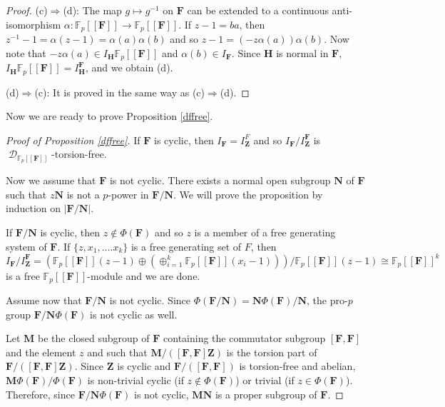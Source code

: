 \documentclass[11pt]{amsart}
\numberwithin{claimcounter}{lem}
\DeclareMathOperator{\D}{\mathcal D}
\newcommand{\F}{\mathbb{F}}
\begin{document}
\begin{proof}
  (c)$\Longrightarrow$(d): The map $g\mapsto g^{-1}$ on $\mathbf F$ can be extended to a continuous anti-isomorphism  $\alpha: \F_p[[\mathbf F]]\to \F_p[[\mathbf F]]$. If $z-1=ba$, then $z^{-1}-1=\alpha(z-1)=\alpha(a)\alpha(b)$ and so $z-1=(-z\alpha(a))\alpha(b)$. Now note that $-z\alpha(a)\in I_\mathbf  H\F_p[[\mathbf F]]$ and $\alpha(b)\in I_{\mathbf F}$. Since $\mathbf H$ is normal in $\mathbf F$, $ I_\mathbf  H\F_p[[\mathbf F]]=I_{\mathbf H}^{\mathbf F}$, and we obtain (d).
 
(d)$\Longrightarrow$(c): It is proved in the same way as (c)$\Longrightarrow$(d).\end{proof}

Now we are ready to prove Proposition \ref{dffree}.
\begin{proof}[Proof of Proposition \ref{dffree}]  If $\mathbf F$ is cyclic, then $I_{\mathbf F}=I_{\mathbf Z}^F$ and so $I_{\mathbf F}/I_\mathbf Z^{\mathbf F}$ is $\D_{\F_p[[\mathbf F]]}$-torsion-free.

Now we assume that $\mathbf F$ is not cyclic.
There exists a normal open subgroup $\mathbf N$ of $\mathbf F$ such that $z\mathbf N$ is not a $p$-power in $\mathbf F/\mathbf N$. We will prove the proposition by induction on $|\mathbf F/\mathbf N|$.

If $\mathbf F/\mathbf N$ is cyclic, then $z\not \in \Phi(\mathbf F)$ and so $z$ is a member of a free generating system of $\mathbf F$. If $\{z,x_1,\ldots. x_k\}$ is a free generating set of $F$, then  
$$I_{\mathbf F}/I_\mathbf Z^{\mathbf F}=(\F_p[[\mathbf F]](z-1)\oplus(\oplus_{i=1}^k \F_p[[\mathbf F]](x_i-1)))/\F_p[[\mathbf F]](z-1)\cong \F_p[[\mathbf F]]^k$$ is a free $\F_p[[\mathbf F]]$-module and we are done.

Assume now that $\mathbf F/\mathbf N$ is  not cyclic. Since $\Phi(\mathbf F/\mathbf N)= \mathbf N\Phi(\mathbf F)/\mathbf N$,   the pro-$p$ group $\mathbf F/\mathbf N\Phi(\mathbf F)$ is not cyclic as well. 

Let $  \mathbf M$ be the closed  subgroup of $\mathbf F$ containing the commutator subgroup  $[\mathbf F,\mathbf F]$ and the element $z$ and such that $\mathbf M/([\mathbf F,\mathbf F]\mathbf Z)$ is the torsion part of $\mathbf F/([\mathbf F,\mathbf F]\mathbf Z)$. Since $\mathbf Z$ is cyclic and   $\mathbf F/([\mathbf F,\mathbf F])$ is torsion-free and  abelian,  $\mathbf M\Phi(\mathbf F)/\Phi(\mathbf F)$ is non-trivial cyclic  (if $z\not \in \Phi(\mathbf F)$) or trivial (if $z\in \Phi( \mathbf F)$).   Therefore, since $\mathbf F/\mathbf N\Phi(\mathbf F)$ is not cyclic, $\mathbf M\mathbf N$ 
is a proper subgroup of $\mathbf F$.


\end{proof}
\end{document}
